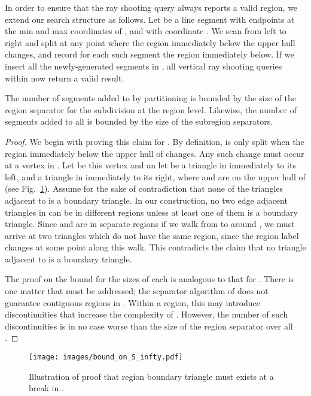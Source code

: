 In order to ensure that the ray shooting query always reports a valid region, we 
extend our search structure  as follows.
Let  be a line segment with endpoints at the min and max 
 coordinates of , and with  coordinate .
We scan  from left to right and split  at any
point where the region immediately below the upper hull changes,
and record for each such segment the region immediately below.
If we insert all the newly-generated segments in , all vertical ray 
shooting queries within  now return a valid result.

\begin{lemma}\label{lem:size_s_infty}
The number of segments added to  by partitioning 
is bounded by the size of the region separator for the subdivision
at the region level. Likewise, the number of segments added 
to all  is bounded by the size of the subregion separators.
\end{lemma}

\begin{proof}
We begin with proving this claim for .
By definition,  is only split when the region immediately
below the upper hull of  changes.
Any such change must occur at a vertex in .
Let  be this vertex and an let  be a triangle in  
immediately to its left, and  a triangle in  immediately
to its right, where  and  are on the upper hull of
 (see Fig.~\ref{fig:pl_s_infty}).
Assume for the sake of contradiction that none of the triangles
adjacent to  is a boundary triangle. 
In our construction, no two edge adjacent triangles in 
can be in different regions unless at least one of them is
a boundary triangle.
Since  and  are in separate regions if we walk 
from  to  around , we must arrive at two 
triangles which do not have the same region, since the
region label changes at some point along this walk.
This contradicts the claim that no triangle adjacent to  is 
a boundary triangle.

The proof on the bound for the sizes of each  is 
analogous to that for .
There is one matter that must be addressed;
the separator algorithm of \cite{Frederickson87} does
not guarantee contiguous regions in .
Within a region, this may introduce discontinuities 
that increase the complexity of .
However, the number of such discontinuities is in no case
worse than the size of the region separator over
all . 

\end{proof}

\begin{figure}
  \centering
  \texttt{[image: images/bound\_on\_S\_infty.pdf]}
  \caption[Bound on size of ]{
  Illustration of proof that region boundary triangle must
  exists at a break in .
  }
  \label{fig:pl_s_infty}
\end{figure}



